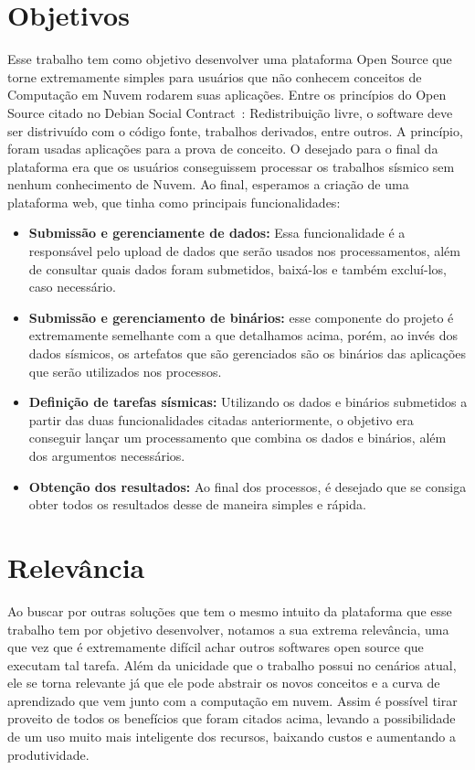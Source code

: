\documentclass[11pt,twoside]{article}
\begin{document}
\section{Objetivos}
Esse trabalho tem como objetivo desenvolver uma plataforma Open Source que torne extremamente simples para usuários que não conhecem conceitos de Computação em Nuvem rodarem suas aplicações.
Entre os princípios do Open Source citado no Debian Social Contract~\cite{BP}: Redistribuição livre, o software deve ser distrivuído com o código fonte, trabalhos derivados, entre outros.
A princípio, foram usadas aplicações para a prova de conceito. O desejado para o final da plataforma era que os usuários conseguissem processar os trabalhos sísmico sem nenhum conhecimento de Nuvem.  
Ao final, esperamos a criação de uma plataforma web, que tinha como principais funcionalidades:

\begin{itemize}
  \item \textbf{Submissão e gerenciamente de dados:} Essa funcionalidade é a responsável pelo upload de dados que serão usados nos processamentos, além de consultar quais dados foram submetidos, baixá-los e também
  excluí-los, caso necessário. 
  \item \textbf{Submissão e gerenciamento de binários:} esse componente do projeto é extremamente semelhante com a que detalhamos acima, porém, ao invés dos dados sísmicos, os artefatos que são gerenciados são os 
  binários das aplicações que serão utilizados nos processos.
  \item \textbf{Definição de tarefas sísmicas:} Utilizando os dados e binários submetidos a partir das duas funcionalidades citadas anteriormente, o objetivo era conseguir lançar um processamento que combina os dados e 
  binários, além dos argumentos necessários.
  \item \textbf{Obtenção dos resultados:} Ao final dos processos, é desejado que se consiga obter todos os resultados desse de maneira simples e rápida.
\end{itemize}

\section{Relevância}
Ao buscar por outras soluções que tem o mesmo intuito da plataforma que esse trabalho tem por objetivo desenvolver, notamos a sua extrema relevância, uma que vez que é extremamente difícil achar outros softwares
open source que executam tal tarefa.
Além da unicidade que o trabalho possui no cenários atual, ele se torna relevante já que ele pode abstrair os novos conceitos e a curva de aprendizado que vem junto com a computação em nuvem. Assim é possível
tirar proveito de todos os benefícios que foram citados acima, levando a possibilidade de um uso muito mais inteligente dos recursos, baixando custos e aumentando a produtividade.
\end{document}

